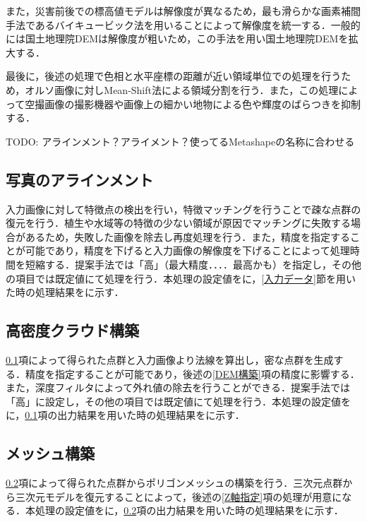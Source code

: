     また，災害前後での標高値モデルは解像度が異なるため，最も滑らかな画素補間手法であるバイキュービック法\cite{論文手法1}を用いることによって解像度を統一する．一般的には国土地理院DEMは解像度が粗いため，この手法を用い国土地理院DEMを拡大する．

    最後に，後述の処理で色相と水平座標の距離が近い領域単位での処理を行うため，オルソ画像に対しMean-Shift法\cite{論文手法2}による領域分割を行う．また，この処理によって空撮画像の撮影機器や画像上の細かい地物による色や輝度のばらつきを抑制する．


    TODO: アラインメント？アライメント？使ってるMetashapeの名称に合わせる
    \subsection{写真のアラインメント}
      \label{写真のアラインメント}
      入力画像に対して特徴点の検出を行い，特徴マッチングを行うことで疎な点群の復元を行う．植生や水域等の特徴の少ない領域が原因でマッチングに失敗する場合があるため，失敗した画像を除去し再度処理を行う．また，精度を指定することが可能であり，精度を下げると入力画像の解像度を下げることによって処理時間を短縮する．提案手法では「高」（最大精度．．．．最高かも）を指定し，その他の項目では既定値にて処理を行う．本処理の設定値を\fref{}に，\ref{入力データ}節を用いた時の処理結果を\fref{}に示す．

    \subsection{高密度クラウド構築}
      \label{高密度クラウド構築}
      \ref{写真のアラインメント}項によって得られた点群と入力画像より法線を算出し，密な点群を生成する．精度を指定することが可能であり，後述の\ref{DEM構築}項の精度に影響する．また，深度フィルタによって外れ値の除去を行うことができる．提案手法では「高」に設定し，その他の項目では既定値にて処理を行う．本処理の設定値を\fref{}に，\ref{写真のアラインメント}項の出力結果を用いた時の処理結果を\fref{}に示す．

    \subsection{メッシュ構築}
      \label{メッシュ構築}
      \ref{高密度クラウド構築}項によって得られた点群からポリゴンメッシュの構築を行う．三次元点群から三次元モデルを復元することによって，後述の\ref{Z軸指定}項の処理が用意になる．本処理の設定値を\fref{}に，\ref{高密度クラウド構築}項の出力結果を用いた時の処理結果を\fref{}に示す．

